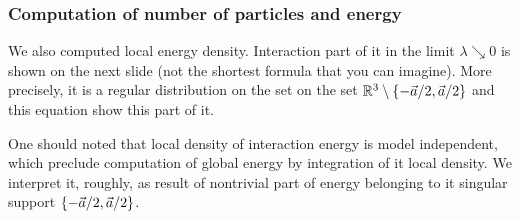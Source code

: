 \documentclass[10pt,t]{beamer}
\begin{document}
\begin{frame}
  \frametitle{Computation of number of particles and energy}


  We also computed local energy density. Interaction part of it
  in the limit $\lambda \searrow 0$ is shown on the next slide (not the shortest
  formula that you can imagine). More precisely, it is a regular
  distribution on the set on the set $\mathbb{R}^{ 3 } \setminus \{ -\vec{a} / 2, \vec{a} / 2\}$
  and this equation show this part of it.

  One should noted that local density of interaction energy is model
  \alert{independent}, which preclude computation of global energy by
  integration of it local density. We interpret it, roughly, as result of
  nontrivial part of energy belonging to it singular support
  $\{ -\vec{a} / 2, \vec{a} / 2 \}$.

\end{frame}
\end{document}
